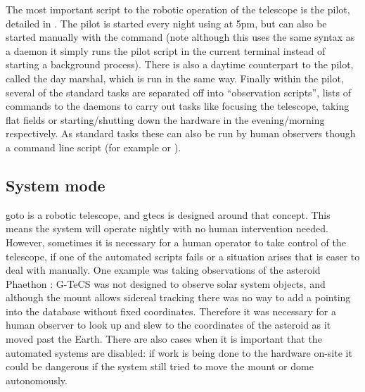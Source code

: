\begin{colsection}
\begin{colsection}
The most important script to the robotic operation of the telescope is the pilot, detailed in . The pilot is started every night using  at 5pm, but can also be started manually with the command  (note although this uses the same syntax as a daemon it simply runs the pilot script in the current terminal instead of starting a background process). There is also a daytime counterpart to the pilot, called the day marshal, which is run in the same way. Finally within the pilot, several of the standard tasks are separated off into ``observation scripts'', lists of commands to the daemons to carry out tasks like focusing the telescope, taking flat fields or starting/shutting down the hardware in the evening/morning respectively. As standard tasks these can also be run by human observers though a command line script  (for example  or ).

\end{colsection}


\subsection{System mode}
\label{sec:mode}
\begin{colsection}

\gls{goto} is a robotic telescope, and \gls{gtecs} is designed around that concept. This means the system will operate nightly with no human intervention needed. However, sometimes it is necessary for a human operator to take control of the telescope, if one of the automated scripts fails or a situation arises that is easer to deal with manually. One example was taking observations of the asteroid Phaethon \citep{Phaethon}: G-TeCS was not designed to observe solar system objects, and although the mount allows sidereal tracking there was no way to add a pointing into the database without fixed coordinates. Therefore it was necessary for a human observer to look up and slew to the coordinates of the asteroid as it moved past the Earth. There are also cases when it is important that the automated systems are disabled: if work is being done to the hardware on-site it could be dangerous if the system still tried to move the mount or dome autonomously.


\end{colsection}
\end{colsection}
